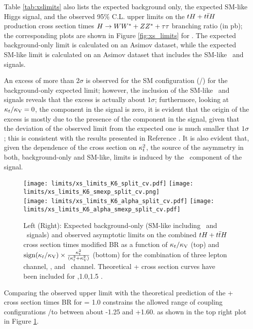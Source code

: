 Table \ref{tab:xslimits} also lists the expected background only, the expected SM-like Higgs signal, and the observed 95\% C.L. upper limits on the $\tH+\ttH$ production cross section times $H \to WW^*+ZZ^*+\tau\tau$ branching ratio (in pb); the corresponding plots are shown in Figure \ref{fig:xs_limits} for . The expected background-only limit is calculated on an Asimov dataset, while the expected SM-like limit is calculated on an Asimov dataset that includes the SM-like \tH\ and \ttH signals.

An excess of more than $2\sigma$ is observed for the SM configuration (\Ct/) for the background-only expected limit; however, the inclusion of the SM-like \tH\ and \ttH signals reveals that the excess is actually about $1\sigma$; furthermore, looking at $\kappa_t/\kappa_\text{V}=0$, \ie the \ttH component in the signal is zero, it is evident that the origin of the excess is mostly due to the presence of the \ttH component in the signal, given that the deviation of the observed limit from the expected one is much smaller that $1\sigma$; this is consistent with the results presented in Reference \cite{CMS_AN_2017-029}. It is also evident that, given the dependence of the \ttH cross section on $\kappa_t^2$, the source of the asymmetry in both, background-only and SM-like, limits is induced by the \tH\ component of the signal.     

\begin{figure} [!h]
 \centering
 \texttt{[image: limits/xs\_limits\_K6\_split\_cv.pdf]}
 \texttt{[image: limits/xs\_limits\_K6\_smexp\_split\_cv.png]}\\ 
 \texttt{[image: limits/xs\_limits\_K6\_alpha\_split\_cv.pdf]}
 \texttt{[image: limits/xs\_limits\_K6\_alpha\_smexp\_split\_cv.pdf]}    
\caption[asymptotic limits on the combined $\tH+\ttH$ cross section times modified BR, ,1.0,1.5 .]{Left (Right): Expected background-only (SM-like including  \ttH\ and \tH\ signals) and observed asymptotic limits on the combined $\tH+\ttH$ cross section times modified BR as a function of $\kappa_t/\kappa_\text{V}$ (top) and $\mathrm{sign}(\kappa_t/\kappa_\text{V})\times\frac{\kappa_t^2}{(\kappa_t^2+\kappa_\text{V}^2)}$ (bottom) for the combination of three lepton channel, \mumu, and \emu\ channel. Theoretical \tH + \ttH cross section curves have been included for ,1.0,1.5 .}
\label{fig:xs_limits_cv}
\end{figure}

Comparing the observed upper limit with the theoretical prediction of the \tH + \ttH cross section times BR for \CV = 1.0 constrains the allowed range of coupling configurations \Ct/\CV to between about -1.25
and +1.60. as shown in the top right plot in Figure \ref{fig:xs_limits_cv}.

